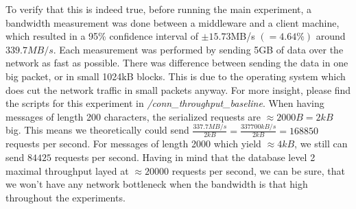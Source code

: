 \documentclass[11pt]{article}
\begin{document}
To verify that this is indeed true, before running the main experiment, a bandwidth measurement was done between a middleware and a client machine, which resulted in a 95\% confidence interval of $\pm15.73$MB/s $(=4.64\%)$ around $339.7MB/s$. Each measurement was performed by sending 5GB of data over the network as fast as possible. There was difference between sending the data in one big packet, or in small 1024kB blocks. This is due to the operating system which does cut the network traffic in small packets anyway. For more insight, please find the scripts for this experiment in \textit{/conn\_throughput\_baseline}. When having messages of length 200 characters, the serialized requests are $\approx2000B=2kB$ big. This means we theoretically could send $\frac{337.7MB/s}{2kB}=\frac{337700kB/s}{2kB}=168850$ requests per second. For messages of length 2000 which yield $\approx4kB$, we still can send $84425$ requests per second. Having in mind that the database level 2 maximal throughput layed at $\approx20000$ requests per second, we can be sure, that we won't have any network bottleneck when the bandwidth is that high throughout the experiments.
\end{document}
